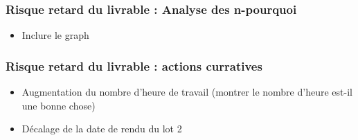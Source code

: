 \begin{frame}
\frametitle{Risque retard du livrable : Analyse des n-pourquoi}
\begin{itemize}
\item Inclure le graph
\end{itemize}
\end{frame}


\begin{frame}
\frametitle{Risque retard du livrable : actions curratives}
\begin{itemize}
\item Augmentation du nombre d'heure de travail (montrer le nombre d'heure est-il une bonne chose)
\item Décalage de la date de rendu du lot 2
\end{itemize}
\end{frame}


